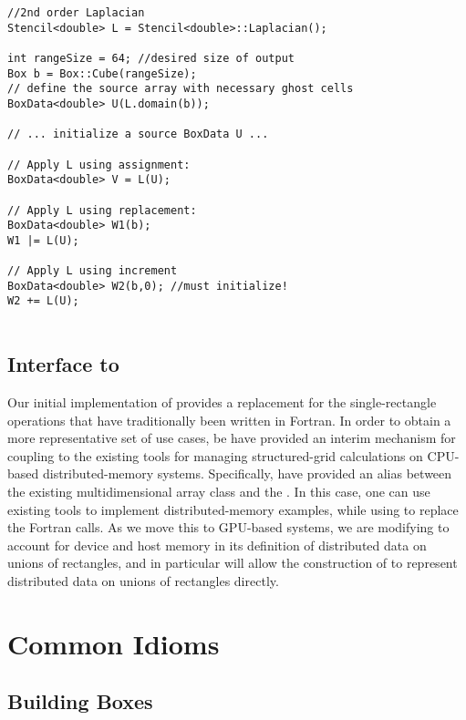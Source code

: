\documentclass[12pt]{article}
\begin{document}
\begin{lstlisting}[caption=Stencil Application, label=lst-stencil-apply]
 //2nd order Laplacian
Stencil<double> L = Stencil<double>::Laplacian();

int rangeSize = 64; //desired size of output
Box b = Box::Cube(rangeSize);
// define the source array with necessary ghost cells
BoxData<double> U(L.domain(b));

// ... initialize a source BoxData U ... 

// Apply L using assignment:
BoxData<double> V = L(U);

// Apply L using replacement:
BoxData<double> W1(b);
W1 |= L(U);

// Apply L using increment
BoxData<double> W2(b,0); //must initialize!
W2 += L(U);
 
\end{lstlisting}

\subsection{Interface to }

Our initial implementation of  provides a replacement for the single-rectangle operations that have traditionally been written in Fortran. In order to obtain a more representative set of use cases, be have provided an interim mechanism for coupling to the existing  tools for managing structured-grid calculations on CPU-based distributed-memory systems. Specifically, have provided an alias between the existing  multidimensional array class  and the  . In this case, one can use existing  tools to implement distributed-memory examples, while using  to replace the Fortran calls. As we move this to GPU-based systems, we are modifying  to account for device and host memory in its definition of distributed data on unions of rectangles, and in particular will allow the construction of  to represent distributed data on unions of rectangles directly.

\section{Common Idioms}

\subsection{Building Boxes}
\end{document}
